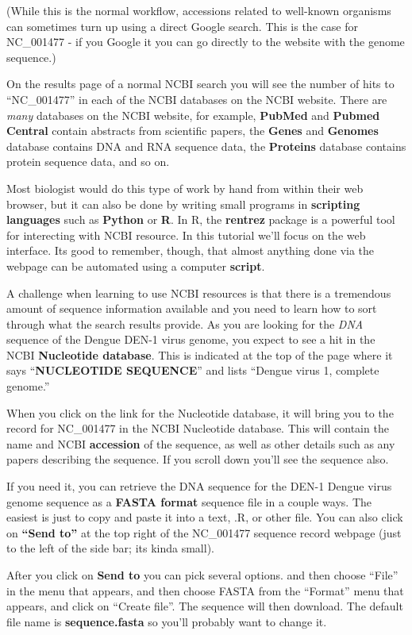 \documentclass[
]{book}
\begin{document}
(While this is the normal workflow, accessions related to well-known organisms can sometimes turn up using a direct Google search. This is the case for NC\_001477 - if you Google it you can go directly to the website with the genome sequence.)

On the results page of a normal NCBI search you will see the number of hits to ``NC\_001477'' in each of the NCBI databases on the NCBI website. There are \emph{many} databases on the NCBI website, for example, \textbf{PubMed} and \textbf{Pubmed Central} contain abstracts from scientific papers, the \textbf{Genes} and \textbf{Genomes} database contains DNA and RNA sequence data, the \textbf{Proteins} database contains protein sequence data, and so on.

Most biologist would do this type of work by hand from within their web browser, but it can also be done by writing small programs in \textbf{scripting languages} such as \textbf{Python} or \textbf{R}. In R, the \textbf{rentrez} package is a powerful tool for interecting with NCBI resource. In this tutorial we'll focus on the web interface. Its good to remember, though, that almost anything done via the webpage can be automated using a computer \textbf{script}.

A challenge when learning to use NCBI resources is that there is a tremendous amount of sequence information available and you need to learn how to sort through what the search results provide. As you are looking for the \emph{DNA} sequence of the Dengue DEN-1 virus genome, you expect to see a hit in the NCBI \textbf{Nucleotide database}. This is indicated at the top of the page where it says ``\textbf{NUCLEOTIDE SEQUENCE}'' and lists ``Dengue virus 1, complete genome.''

When you click on the link for the Nucleotide database, it will bring you to the record for NC\_001477 in the NCBI Nucleotide database. This will contain the name and NCBI \textbf{accession} of the sequence, as well as other details such as any papers describing the sequence. If you scroll down you'll see the sequence also.

If you need it, you can retrieve the DNA sequence for the DEN-1 Dengue virus genome sequence as a \textbf{FASTA format} sequence file in a couple ways. The easiest is just to copy and paste it into a text, .R, or other file. You can also click on \textbf{``Send to''} at the top right of the NC\_001477 sequence record webpage (just to the left of the side bar; its kinda small).

After you click on \textbf{Send to} you can pick several options. and then choose ``File'' in the menu that appears, and then choose FASTA from the ``Format'' menu that appears, and click on ``Create file''. The sequence will then download. The default file name is \textbf{sequence.fasta} so you'll probably want to change it.
\end{document}
